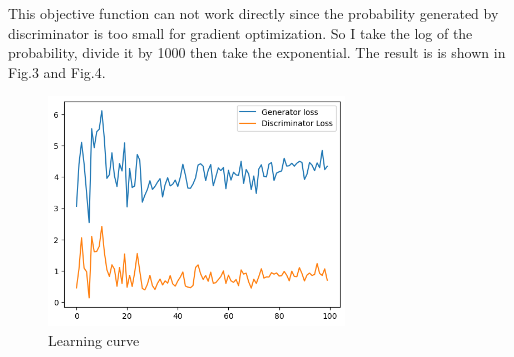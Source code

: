 \documentclass[a4paper]{article}
\theoremstyle{definition}
\newenvironment{soln}{
	\leavevmode\color{blue}\ignorespaces
}{}
\begin{document}
\begin{enumerate} [label=(\alph*)]
		\begin{soln}  
			This objective function can not work directly since the probability generated by discriminator is too small for gradient optimization. So I take the log of the probability, divide it by 1000 then take the exponential. The result is is shown in Fig.3 and Fig.4.
			\begin{figure}[H]
				\centering
				\includegraphics[width=0.7\textwidth]{gan_q2_loss.png}
				\caption{Learning curve}
				\label{fig:gan_q1_loss}
			\end{figure}
			

\end{soln}
\end{enumerate}
\end{document}
